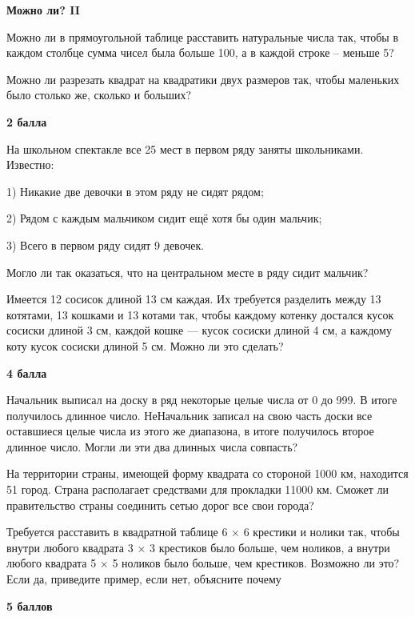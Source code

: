 \centerline{\bf \Huge Можно ли? II}

 Можно ли в прямоугольной таблице расставить натуральные числа так, чтобы в каждом столбце сумма чисел была больше 100, а в каждой строке – меньше 5?

 Можно ли разрезать квадрат на квадратики двух размеров так, чтобы маленьких было столько же, сколько и больших?

\begin{flushright} \textbf{2 балла}\\ 
\end{flushright}

 На школьном спектакле все 25 мест в первом ряду заняты
школьниками. Известно:

1) Никакие две девочки в этом ряду не сидят рядом;

2) Рядом с каждым мальчиком сидит ещё хотя бы один мальчик;

3) Всего в первом ряду сидят 9 девочек.

Могло ли так оказаться, что на центральном месте в ряду сидит мальчик?

 Имеется 12 сосисок длиной 13 см каждая. Их
требуется разделить между 13 котятами, 13 кошками и 13 котами так, чтобы каждому
котенку достался кусок сосиски длиной 3 см, каждой кошке — кусок сосиски длиной
4 см, а каждому коту кусок сосиски длиной 5 см. Можно ли это сделать?
\begin{flushright} \textbf{4 балла}\\ 
\end{flushright}


 Начальник выписал на доску в ряд некоторые целые числа от 0 до
999. В итоге получилось длинное число. НеНачальник записал на свою часть доски все оставшиеся
целые числа из этого же диапазона, в итоге получилось второе длинное число. Могли ли эти
два длинных числа совпасть?


 На территории страны, имеющей форму квадрата со стороной 1000 км, находится 51 город. Страна располагает средствами для прокладки 11000 км. Сможет ли правительство страны соединить сетью дорог все свои города?

 Требуется расставить в квадратной таблице 6 × 6 крестики
и нолики так, чтобы внутри любого квадрата 3 × 3 крестиков было больше, чем ноликов, а
внутри любого квадрата 5 × 5 ноликов было больше, чем крестиков. Возможно ли это? Если
да, приведите пример, если нет, объясните почему

\begin{flushright} \textbf{5 баллов}\\ 
\end{flushright}